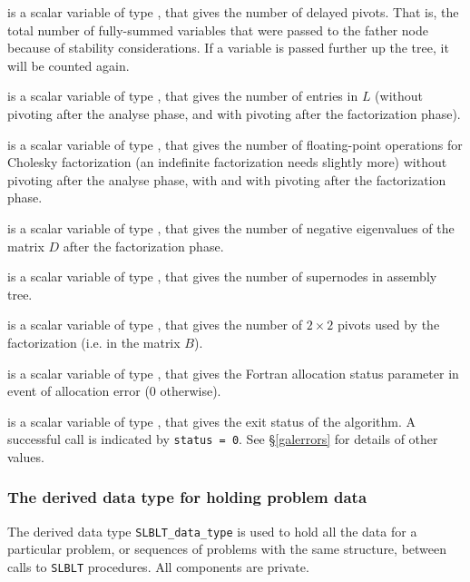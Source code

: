 \documentclass{galahad}
\newcommand{\packagename}{SLBLT}
\begin{document}
\begin{description}
is a scalar variable of type \integer,
that gives the number of delayed pivots. That is, the total
number of fully-summed variables that were passed to the father node
because of stability considerations. If a variable is passed further
up the tree, it will be counted again.

is a scalar variable of type \longinteger,
that gives the number of entries in $L$ (without pivoting
after the analyse phase, and with pivoting after the factorization phase).

is a scalar variable of type \longinteger,
that gives the number of floating-point operations for Cholesky
factorization (an indefinite factorization needs slightly more)
without pivoting after the analyse phase, with and with pivoting after 
the factorization phase.

is a scalar variable of type \integer,
that gives the number of negative eigenvalues of the matrix $D$
after the factorization phase.

is a scalar variable of type \integer,
that gives the number of supernodes in assembly tree.

is a scalar variable of type \integer,
that gives the number of $2 \times 2$ pivots used by the
factorization (i.e. in the matrix $B$).

is a scalar variable of type \integer,
that gives the Fortran allocation status parameter in event of allocation
error (0 otherwise).

is a scalar variable of type \integer,
that gives the exit status of the algorithm.
A successful call is indicated by {\tt status = 0}.
See \S\ref{galerrors} for details of other values.

\end{description}


\subsubsection{The derived data type for holding problem data}\label{typedata}
The derived data type
{\tt \packagename\_data\_type}
is used to hold all the data for a particular problem,
or sequences of problems with the same structure, between calls to
{\tt \packagename} procedures.
All components are private.
\end{document}
